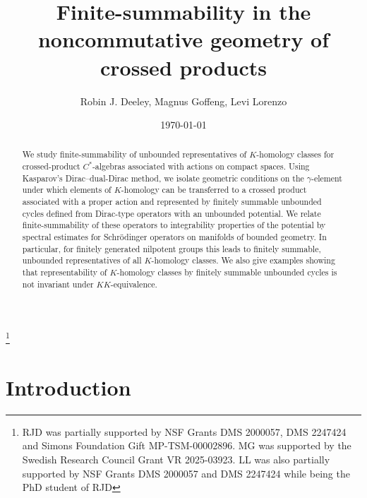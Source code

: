 \documentclass[a4paper,reqno]{amsart}
\numberwithin{equation}{section}
\theoremstyle{definition}
\theoremstyle{remark}
\begin{document}
\date{\today}


\title[Finite-summability in noncommutative geometry]{Finite-summability in the noncommutative geometry of crossed products}


\author{Robin J. Deeley, Magnus Goffeng, Levi Lorenzo}


\address[R. J. Deeley]{Department of Mathematics, University of Colorado Boulder Campus Box 395, Boulder, CO 80309-0395, USA}


\address[M. Goffeng]{Centre for Mathematical Sciences, Lund University, Sweden}


\address[L. Lorenzo]{Department of Mathematics, Fort Lewis College, 1000 Rim Drive, Durango, Colorado 81301-3999, USA}


\thanks{RJD was partially supported by NSF Grants DMS 2000057, DMS 2247424 and Simons Foundation Gift MP-TSM-00002896. MG was supported by the Swedish Research Council Grant VR 2025-03923. LL was also partially supported by NSF Grants DMS 2000057 and DMS 2247424 while being the PhD student of RJD}



\maketitle


\begin{abstract}
We study finite-summability of unbounded representatives of $K$-homology classes for crossed-product $C^*$-algebras associated with actions on compact spaces. Using Kasparov's Dirac--dual-Dirac method, we isolate geometric conditions on the $\gamma$-element under which elements of $K$-homology can be transferred to a crossed product associated with a proper action and represented by finitely summable unbounded cycles defined from Dirac-type operators with an unbounded potential. We relate finite-summability of these operators to integrability properties of the potential by spectral estimates for Schrödinger operators on manifolds of bounded geometry. In particular, for finitely generated nilpotent groups this leads to finitely summable, unbounded representatives of all $K$-homology classes. We also give examples showing that representability of $K$-homology classes by finitely summable unbounded cycles is not invariant under $KK$-equivalence.
\end{abstract}


\section{Introduction}
\end{document}
